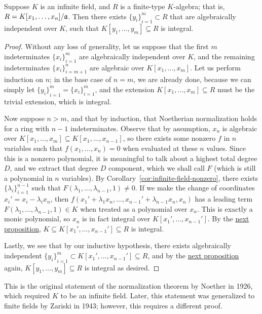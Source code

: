 \begin{theorem}\label{thm:noetherian-normalization}
    Suppose \(K\) is an infinite field, and \(R\) is a finite-type \(K\)-algebra;
    that is, \(R = K[x_1,\hdots,x_n]/\mathfrak{a}\).
    Then there exists \({\{y_i\}}_{i=1}^m \subset R\) that are algebraically independent over \(K\),
    such that \(K[y_1,\hdots,y_m] \subseteq R\) is integral.
\end{theorem}
\begin{proof}
    Without any loss of generality,
    let us suppose that the first \(m\) indeterminates \({\{x_i\}}_{i=1}^m\) are algebraically independent over \(K\),
    and the remaining indeterminates \({\{x_i\}}_{i=m+1}^n\) are algebraic over \(K[x_1,\hdots,x_m]\).
    Let us perform induction on \(n\);
    in the base case of \(n = m\), we are already done,
    because we can simply let \({\{y_i\}}_{i=1}^m = {\{x_i\}}_{i=1}^m\),
    and the extension \(K[x_1,\hdots,x_m] \subseteq R\) must be the trivial extension, which is integral.

    Now suppose \(n > m\), and that by induction,
    that Noetherian normalization holds for a ring with \(n-1\) indeterminates.
    Observe that by assumption, \(x_n\) is algebraic over \(K[x_1,\hdots,x_m] \subseteq K[x_1,\hdots,x_{n-1}]\),
    so there exists some nonzero \(f\) in \(n\) variables such that \(f(x_1,\hdots,x_n) = 0\) when evaluated at these \(n\) values.
    Since this is a nonzero polynomial, it is meaningful to talk about a highest total degree \(D\),
    and we extract that degree \(D\) component, which we shall call \(F\) (which is still a polynomial in \(n\) variables).
    By Corollary~\ref{cor:infinite-field-nonzero},
    there exists \({\{\lambda_i\}}_{i=1}^{n-1}\) such that \(F(\lambda_1,\hdots,\lambda_{n-1},1) \neq 0\).
    If we make the change of coordinates \(x_i' = x_i - \lambda_i x_n\),
    then \(f(x_1'+\lambda_1 x_n,\hdots,x_{n-1}'+\lambda_{n-1}x_n,x_n)\)
    has a leading term \(F(\lambda_1,\hdots,\lambda_{n-1},1) \in K\) when treated as a polynomial over \(x_n\).
    This is exactly a monic polynomial,
    so \(x_n\) is in fact integral over \(K[x_1',\hdots,x_{n-1}']\).
    By the \hyperref[prop:integral-finite-properties]{next proposition},
    \(K \subseteq K[x_1',\hdots,x_{n-1}'] \subseteq R\) is integral.

    Lastly, we see that by our inductive hypothesis,
    there exists algebraically independent \({\{y_i\}}_{i=1}^m \subset K[x_1',\hdots,x_{n-1}'] \subseteq R\),
    and by the \hyperref[prop:integral-finite-properties]{next proposition} again,
    \(K[y_1,\hdots,y_m] \subseteq R\) is integral as desired.
\end{proof}
\begin{remark}
    This is the original statement of the normalization theorem by Noether in 1926,
    which required \(K\) to be an infinite field.
    Later, this statement was generalized to finite fields by Zariski in 1943;
    however, this requires a different proof.
\end{remark}


